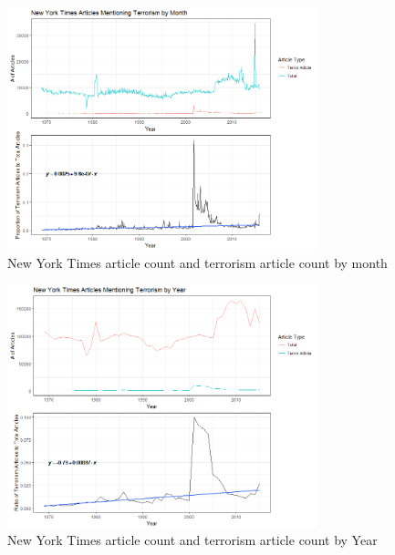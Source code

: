\documentclass[10pt,a4paper]{article}
\begin{document}
\begin{center}
\begin{figure}[h!]
		
	\includegraphics[width=0.8\textwidth]{Plots/NewsData/ArticlesByMonth.png}
	\caption{New York Times article count and terrorism article count by month}

\end{figure}

\begin{figure}[h!]
		
	\includegraphics[width=0.8\textwidth]{Plots/NewsData/ArticlesByYear.png}
	\caption{New York Times article count and terrorism article count by Year}

\end{figure}

\begin{figure}[h!]


\end{figure}
\end{center}
\end{document}

